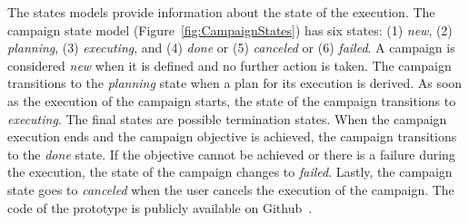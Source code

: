 The states models provide information about the state of the execution. The
campaign state model (Figure~\ref{fig:CampaignStates}) has six states: (1)
\textit{new}, (2) \textit{planning}, (3) \textit{executing}, and (4)
\textit{done} or (5) \textit{canceled} or (6) \textit{failed}. A campaign is
considered \textit{new} when it is defined and no further action is taken. The
campaign transitions to the \textit{planning} state when a plan for its
execution is derived. As soon as the execution of the campaign starts, the state
of the campaign transitions to \textit{executing}. The final states are possible
termination states. When the campaign execution ends and the campaign objective
is achieved, the campaign transitions to the \textit{done} state. If the
objective cannot be achieved or there is a failure during the execution, the
state of the campaign changes to \textit{failed}. Lastly, the campaign state
goes to \textit{canceled} when the user cancels the execution of the campaign.
The code of the prototype is publicly available on Github~\cite{cm_git}.


